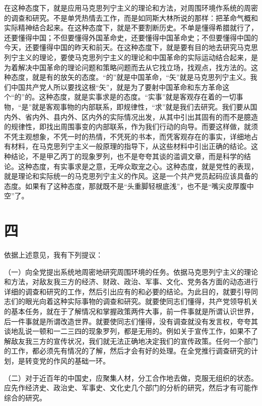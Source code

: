 在这种态度下，就是应用马克思列宁主义的理论和方法，对周围环境作系统的周密的调查和研究。不是单凭热情去工作，而是如同斯大林所说的那样：把革命气概和实际精神结合起来。在这种态度下，就是不要割断历史。不单是懂得希腊就行了，还要懂得中国；不但要懂得外国革命史，还要懂得中国革命史；不但要懂得中国的今天，还要懂得中国的昨天和前天。在这种态度下，就是要有目的地去研究马克思列宁主义的理论，要使马克思列宁主义的理论和中国革命的实际运动结合起来，是为着解决中国革命的理论问题和策略问题而去从它找立场，找观点，找方法的。这种态度，就是有的放矢的态度。“的”就是中国革命，“矢”就是马克思列宁主义。我们中国共产党人所以要找这根“矢”，就是为了要射中国革命和东方革命这个“的”的。这种态度，就是实事求是的态度。“实事”就是客观存在着的一切事物，“是”就是客观事物的内部联系，即规律性，“求”就是我们去研究。我们要从国内外、省内外、县内外、区内外的实际情况出发，从其中引出其固有的而不是臆造的规律性，即找出周围事变的内部联系，作为我们行动的向导。而要这样做，就须不凭主观想象，不凭一时的热情，不凭死的书本，而凭客观存在的事实，详细地占有材料，在马克思列宁主义一般原理的指导下，从这些材料中引出正确的结论。这种结论，不是甲乙丙丁的现象罗列，也不是夸夸其谈的滥调文章，而是科学的结论。这种态度，有实事求是之意，无哗众取宠之心。这种态度，就是党性的表现，就是理论和实际统一的马克思列宁主义的作风。这是一个共产党员起码应该具备的态度。如果有了这种态度，那就既不是“头重脚轻根底浅”，也不是“嘴尖皮厚腹中空”了。

\section*{四}

依据上述意见，我有下列提议：

（一）向全党提出系统地周密地研究周围环境的任务。依据马克思列宁主义的理论和方法，对敌友我三方的经济、财政、政治、军事、文化、党务各方面的动态进行详细的调查和研究的工作，然后引出应有的和必要的结论。为此目的，就要引导同志们的眼光向着这种实际事物的调查和研究。就要使同志们懂得，共产党领导机关的基本任务，就在于了解情况和掌握政策两件大事，前一件事就是所谓认识世界，后一件事就是所谓改造世界。就要使同志们懂得，没有调查就没有发言权，夸夸其谈地乱说一顿和一二三四的现象罗列，都是无用的。例如关于宣传工作，如果不了解敌友我三方的宣传状况，我们就无法正确地决定我们的宣传政策。任何一个部门的工作，都必须先有情况的了解，然后才会有好的处理。在全党推行调查研究的计划，是转变党的作风的基础一环。

（二）对于近百年的中国史，应聚集人材，分工合作地去做，克服无组织的状态。应先作经济史、政治史、军事史、文化史几个部门的分析的研究，然后才有可能作综合的研究。

